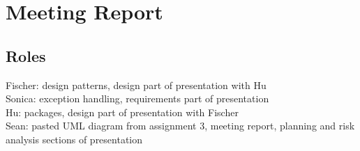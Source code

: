 \section{Meeting Report}

\subsection{Roles}
Fischer: design patterns, design part of presentation with Hu\\
Sonica: exception handling, requirements part of presentation\\
Hu: packages, design part of presentation with Fischer\\
Sean: pasted UML diagram from assignment 3, meeting report, planning and risk analysis sections of presentation\\